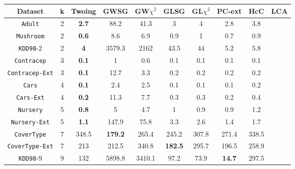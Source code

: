 \begin{table}[]
\scriptsize
\centering
\begin{tabular}{c|c|c|c|c|c|c|c|c|c}
Dataset             & k  & Twoing     & GWSG       & GW$\chi^2$  & GLSG      & GL$\chi^2$ & PC-ext     & HcC        & LCA        \\
\hline
{\tt Adult}         & 2  & {\bf 2.7}  & 88.2       & 41.3        & 3         & 4          & 2.8        & 3.8        &            \\
{\tt Mushroom}      & 2  & {\bf 0.6}  & 8.6        & 6.9         & 0.9       & 1          & 0.7        & 0.9        &            \\
{\tt KDD98}-2       & 2  & {\bf 4}    & 3579.3     & 2162        & 43.5      & 44         & 5.2        & 5.8        &            \\
{\tt Contracep}     & 3  & {\bf 0.1}  & 1          & 0.6         & 0.1       & 0.1        & 0.1        & 0.1        &            \\
{\tt Contracep-Ext} & 3  & {\bf 0.1}  & 12.7       & 3.3         & 0.2       & 0.2        & 0.2        & 0.2        &            \\
{\tt Cars}          & 4  & {\bf 0.1}  & 2.4        & 2.5         & 0.1       & 0.1        & 0.1        & 0.2        &            \\
{\tt Cars-Ext}      & 4  & {\bf 0.2}  & 11.3       & 7.7         & 0.3       & 0.3        & 0.2        & 0.4        &            \\
{\tt Nursery}       & 5  & {\bf 0.8}  & 5          & 4.7         & 1         & 0.9        & 0.9        & 1.2        &            \\
{\tt Nursery-Ext}   & 5  & {\bf 1.1}  & 147.9      & 75.8        & 3.3       & 2.6        & 1.4        & 1.7        &            \\
{\tt CoverType}     & 7  & 348.5      & {\bf 179.2}&  265.4      & 245.2     & 307.8      & 271.4      & 338.5      &            \\
{\tt CoverType-Ext} & 7  & 213        & 212.5      & 340.8       &{\bf 182.5}& 295.7      & 196.5      & 258.9      &            \\
{\tt KDD98}-9       & 9  & 132        & 5898.8     & 3410.1      & 97.2      & 73.9       & {\bf 14.7 }& 297.5      &            \\ 

\end{tabular}
\end{table}

